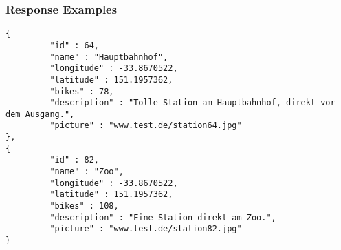 \subsubsection{Response Examples}\label{response-examples}

\begin{verbatim}
{
         "id" : 64,
         "name" : "Hauptbahnhof",
         "longitude" : -33.8670522,
         "latitude" : 151.1957362,
         "bikes" : 78,
         "description" : "Tolle Station am Hauptbahnhof, direkt vor dem Ausgang.",
         "picture" : "www.test.de/station64.jpg"
},
{
         "id" : 82,
         "name" : "Zoo",
         "longitude" : -33.8670522,
         "latitude" : 151.1957362,
         "bikes" : 108,
         "description" : "Eine Station direkt am Zoo.",
         "picture" : "www.test.de/station82.jpg"
}
\end{verbatim}
